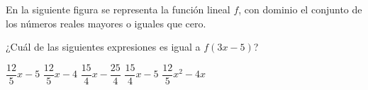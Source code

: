 \documentclass[
  titulo=Prueba,
  subtitulo=Álgebra y funciones,
  curso=Tercero medio A,
  fecha=2025-09-23,
  con nombre,
  ppp=1
]{srs3}
\begin{document}
\begin{preguntas}
\pregunta En la siguiente figura se representa la función lineal \(f\), con dominio el conjunto de los números reales mayores o iguales que cero.
\begin{columnas}[0.6][t]
¿Cuál de las siguientes expresiones es igual a \(f\left(3x-5\right)\)?
\begin{alternativas}
\alternativa \(\dfrac{12}{5}x-5\)
\alternativa \(\dfrac{12}{5}x-4\)
\alternativa \(\dfrac{15}{4}x-\dfrac{25}{4}\)
\alternativa \(\dfrac{15}{4}x-5\)
\alternativa \(\dfrac{12}{5}x^2 - 4x\)
\end{alternativas}
\siguiente
{}
\end{columnas}


\end{preguntas}
\end{document}
